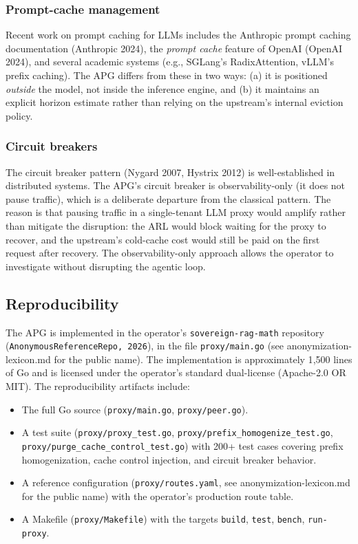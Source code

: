 \subsubsection{Prompt-cache management}

Recent work on prompt caching for LLMs includes the Anthropic
prompt caching documentation (Anthropic 2024), the
\textit{prompt cache} feature of OpenAI (OpenAI 2024), and
several academic systems (e.g., SGLang's RadixAttention,
vLLM's prefix caching). The APG differs from these in two
ways: (a) it is positioned \emph{outside} the model, not
inside the inference engine, and (b) it maintains an explicit
horizon estimate rather than relying on the upstream's
internal eviction policy.

\subsubsection{Circuit breakers}

The circuit breaker pattern (Nygard 2007, Hystrix 2012) is
well-established in distributed systems. The APG's circuit
breaker is observability-only (it does not pause traffic),
which is a deliberate departure from the classical pattern.
The reason is that pausing traffic in a single-tenant LLM
proxy would amplify rather than mitigate the disruption: the
ARL would block waiting for the proxy to recover, and the
upstream's cold-cache cost would still be paid on the first
request after recovery. The observability-only approach
allows the operator to investigate without disrupting the
agentic loop.

\subsection{Reproducibility}
\label{app:apg:reproduce}

The APG is implemented in the operator's
\texttt{sovereign-rag-math} repository
(\texttt{AnonymousReferenceRepo, 2026}), in the file
\texttt{proxy/main.go} (see anonymization-lexicon.md for the
public name). The implementation is approximately 1{,}500
lines of Go and is licensed under the operator's standard
dual-license (Apache-2.0 OR MIT). The reproducibility
artifacts include:

\begin{itemize}
  \item The full Go source (\texttt{proxy/main.go},
        \texttt{proxy/peer.go}).
  \item A test suite (\texttt{proxy/proxy\_test.go},
        \texttt{proxy/prefix\_homogenize\_test.go},
        \texttt{proxy/purge\_cache\_control\_test.go}) with
        200+ test cases covering prefix homogenization, cache
        control injection, and circuit breaker behavior.
  \item A reference configuration (\texttt{proxy/routes.yaml},
        see anonymization-lexicon.md for the public name) with
        the operator's production route table.
  \item A Makefile (\texttt{proxy/Makefile}) with the targets
        \texttt{build}, \texttt{test}, \texttt{bench},
        \texttt{run-proxy}.
\end{itemize}

